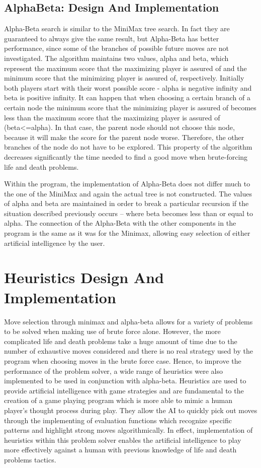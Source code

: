 \documentclass{l3proj}
\begin{document}
\subsection{AlphaBeta: Design And Implementation}

Alpha-Beta search is similar to the MiniMax tree search. In fact they are guaranteed to always give the same result, but Alpha-Beta has better performance, since some of the branches of possible future moves are not investigated. The algorithm maintains two values, alpha and beta, which represent the maximum score that the maximizing player is assured of and the minimum score that the minimizing player is assured of, respectively. Initially both players start with their worst possible score - alpha is negative infinity and beta is positive infinity. It can happen that when choosing a certain branch of a certain node the minimum score that the minimizing player is assured of becomes less than the maximum score that the maximizing player is assured of (beta<=alpha). In that case, the parent node should not choose this node, because it will make the score for the parent node worse. Therefore, the other branches of the node do not have to be explored. This property of the algorithm decreases significantly the time needed to find a good move when brute-forcing life and death problems.

Within the program, the implementation of Alpha-Beta does not differ much to the one of the MiniMax and again the actual tree is not constructed. The values of alpha and beta are maintained in order to break a particular recursion if the situation described previously occurs – where beta becomes less than or equal to alpha. The connection of the Alpha-Beta with the other components in the program is the same as it was for the Minimax, allowing easy selection of either artificial intelligence by the user.

\section{Heuristics Design And Implementation}

Move selection through minimax and alpha-beta allows for a variety of problems to be solved when making use of brute force alone. However, the more complicated life and death problems take a huge amount of time due to the number of exhaustive moves considered and there is no real strategy used by the program when choosing moves in the brute force case. Hence, to improve the performance of the problem solver, a wide range of heuristics were also implemented to be used in conjunction with alpha-beta. Heuristics are used to provide artificial intelligence with game strategies and are fundamental to the creation of a game playing program which is more able to mimic a human player's thought process during play. They allow the AI to quickly pick out moves through the implementing of evaluation functions which recognize specific patterns and highlight strong moves algorithmically. In effect, implementation of heuristics within this problem solver enables the artificial intelligence to play more effectively against a human with previous knowledge of life and death problems tactics.
\end{document}
